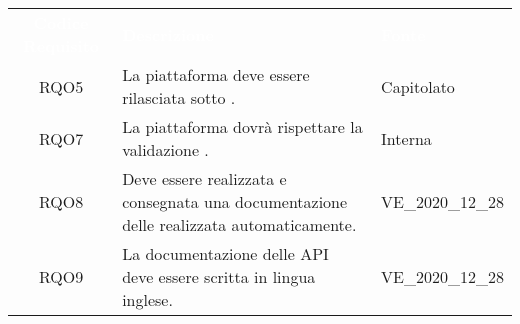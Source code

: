 \renewcommand{\arraystretch}{1.5}
\begin{longtable}{|c C{9.5cm} C{2.5cm}|} 
	
	\textcolor{white}{\textbf{Codice Requisito}}&
	\textcolor{white}{\textbf{Descrizione}}&
	\textcolor{white}{\textbf{Fonte}}\\	

	RQO5 & La piattaforma deve essere rilasciata sotto . & Capitolato  \\

	RQO7 & La piattaforma dovrà rispettare la validazione . & Interna \\
	
	RQO8 & Deve essere realizzata e consegnata una documentazione delle  realizzata automaticamente. & VE\_2020\_12\_28 \\
	
	RQO9 & La documentazione delle API deve essere scritta in lingua inglese. & VE\_2020\_12\_28 \\
	
\end{longtable}

